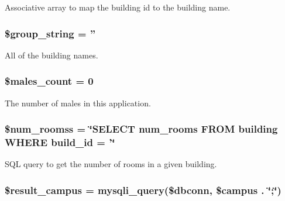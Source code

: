 \-Associative array to map the building id to the building name. \hypertarget{admin__view_2index_8php_a9f3ee723b1a892569e6de7af06e4e7b5}{
\subsubsection[{\$group\-\_\-string}]{\setlength{\rightskip}{0pt plus 5cm}\$group\-\_\-string = ''}}\label{admin__view_2index_8php_a9f3ee723b1a892569e6de7af06e4e7b5}
\-All of the building names. \hypertarget{admin__view_2index_8php_a8d7947787809be82314a3f1843adb460}{
\subsubsection[{\$males\-\_\-count}]{\setlength{\rightskip}{0pt plus 5cm}\$males\-\_\-count = 0}}\label{admin__view_2index_8php_a8d7947787809be82314a3f1843adb460}
\-The number of males in this application. \hypertarget{admin__view_2index_8php_a042bc70123c1cedbe0ebc14950c86267}{
\subsubsection[{\$num\-\_\-roomss}]{\setlength{\rightskip}{0pt plus 5cm}\$num\-\_\-roomss = \char`\"{}\-S\-E\-L\-E\-C\-T num\-\_\-rooms \-F\-R\-O\-M building \-W\-H\-E\-R\-E build\-\_\-id = '\char`\"{}}}\label{admin__view_2index_8php_a042bc70123c1cedbe0ebc14950c86267}
\-S\-Q\-L query to get the number of rooms in a given building. \hypertarget{admin__view_2index_8php_afdd2ad9cb7726ebdf33d1095eac78a1a}{
\subsubsection[{\$result\-\_\-campus}]{\setlength{\rightskip}{0pt plus 5cm}\$result\-\_\-campus = mysqli\-\_\-query(\$dbconn, \$campus . \char`\"{};\char`\"{})}}\label{admin__view_2index_8php_afdd2ad9cb7726ebdf33d1095eac78a1a}
